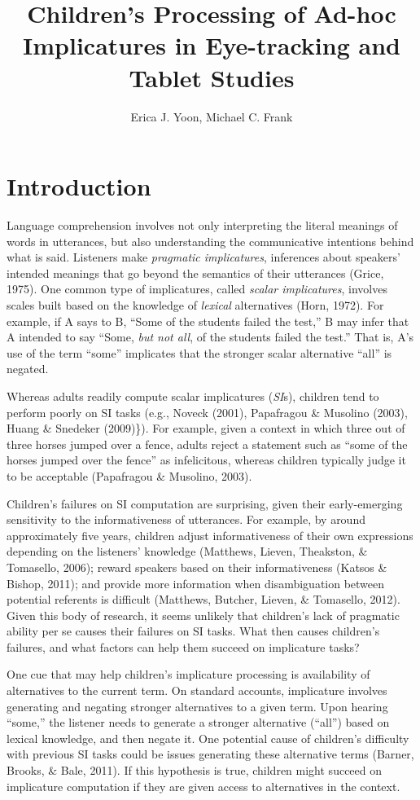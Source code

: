 \documentclass[a4paper,man,apacite,floatsintext]{apa6}
\date{}
\title{\textbf{Children's Processing of Ad-hoc Implicatures in Eye-tracking and Tablet
Studies}}
\author{Erica J. Yoon, Michael C. Frank}
\affiliation{Department of Psychology, Stanford University}
\begin{document}
\maketitle

\section{Introduction}\label{introduction}

Language comprehension involves not only interpreting the literal
meanings of words in utterances, but also understanding the
communicative intentions behind what is said. Listeners make
\emph{pragmatic implicatures}, inferences about speakers' intended
meanings that go beyond the semantics of their utterances (Grice, 1975).
One common type of implicatures, called \emph{scalar implicatures},
involves scales built based on the knowledge of \emph{lexical}
alternatives (Horn, 1972). For example, if A says to B, ``Some of the
students failed the test,'' B may infer that A intended to say ``Some,
\emph{but not all}, of the students failed the test.'' That is, A's use
of the term ``some'' implicates that the stronger scalar alternative
``all'' is negated.

Whereas adults readily compute scalar implicatures (\emph{SI}s),
children tend to perform poorly on SI tasks (e.g., Noveck (2001),
Papafragou \& Musolino (2003), Huang \& Snedeker (2009)\}). For example,
given a context in which three out of three horses jumped over a fence,
adults reject a statement such as ``some of the horses jumped over the
fence'' as infelicitous, whereas children typically judge it to be
acceptable (Papafragou \& Musolino, 2003).

Children's failures on SI computation are surprising, given their
early-emerging sensitivity to the informativeness of utterances. For
example, by around approximately five years, children adjust
informativeness of their own expressions depending on the listeners'
knowledge (Matthews, Lieven, Theakston, \& Tomasello, 2006); reward
speakers based on their informativeness (Katsos \& Bishop, 2011); and
provide more information when disambiguation between potential referents
is difficult (Matthews, Butcher, Lieven, \& Tomasello, 2012). Given this
body of research, it seems unlikely that children's lack of pragmatic
ability per se causes their failures on SI tasks. What then causes
children's failures, and what factors can help them succeed on
implicature tasks?

One cue that may help children's implicature processing is availability
of alternatives to the current term. On standard accounts, implicature
involves generating and negating stronger alternatives to a given term.
Upon hearing ``some,'' the listener needs to generate a stronger
alternative (``all'') based on lexical knowledge, and then negate it.
One potential cause of children's difficulty with previous SI tasks
could be issues generating these alternative terms (Barner, Brooks, \&
Bale, 2011). If this hypothesis is true, children might succeed on
implicature computation if they are given access to alternatives in the
context.
\end{document}
